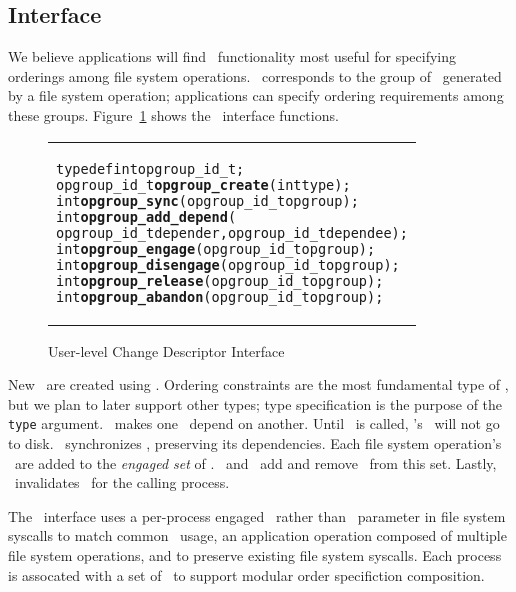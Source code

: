 \subsection{Interface}
\label{sec:opgroup:interface}
We believe applications will find \chdesc\ functionality most useful
for specifying orderings among file system operations.  \Anopgroup\
corresponds to the group of \chdescs\ generated by a file system
operation; applications can specify ordering requirements among these
groups. Figure~\ref{fig:opgroup-interface} shows the \opgroup\
interface functions.

\newcommand{\opgroupid}{opgroup\_id\_t}

\begin{figure}[htb]
\vskip-14pt
\begin{tabular}{@{\hskip0.0in}p{2in}@{}}
\begin{scriptsize}
\begin{alltt}
typedef int opgroup_id_t;
opgroup_id_t \textbf{opgroup_create}(int type);
int \textbf{opgroup_sync}(opgroup_id_t opgroup);
int \textbf{opgroup_add_depend}(
    opgroup_id_t depender, opgroup_id_t dependee);
int \textbf{opgroup_engage}(opgroup_id_t opgroup);
int \textbf{opgroup_disengage}(opgroup_id_t opgroup);
int \textbf{opgroup_release}(opgroup_id_t opgroup);
int \textbf{opgroup_abandon}(opgroup_id_t opgroup);
\end{alltt}
\end{scriptsize}
\end{tabular}
\vspace{-10pt}
\caption{\label{fig:opgroup-interface} User-level Change Descriptor Interface}
\end{figure}

New \opgroups\ are created using \opgroupCreate. Ordering constraints
are the most fundamental type of \opgroups, but we plan to later
support other types\todo{Mention transactional?}; type specification
is the purpose of the \texttt{type} argument.
%
\opgroupAddDepend\ makes one \opgroup\ depend on another.
%
Until \opgroupRelease\ is called, \anopgroup{}'s \chdescs\ will not go
to disk.
%
\opgroupSync\ synchronizes \anopgroup, preserving its dependencies.
%
Each file system operation's \chdescs\ are added to the
\textit{engaged set} of \opgroups. \opgroupEngage\ and
\opgroupDisengage\ add and remove \anopgroup\ from this set.
%
Lastly, \opgroupAbandon\ invalidates \anopgroup\ for the calling process.

The \opgroup\ interface uses a per-process engaged \opgroup\ rather
than \anopgroup\ parameter in file system syscalls to match common
\opgroup\ usage, an application operation composed of multiple file
system operations, and to preserve existing file system syscalls.
Each process is assocated with a set of \opgroups\ to support modular
order specifiction composition.

